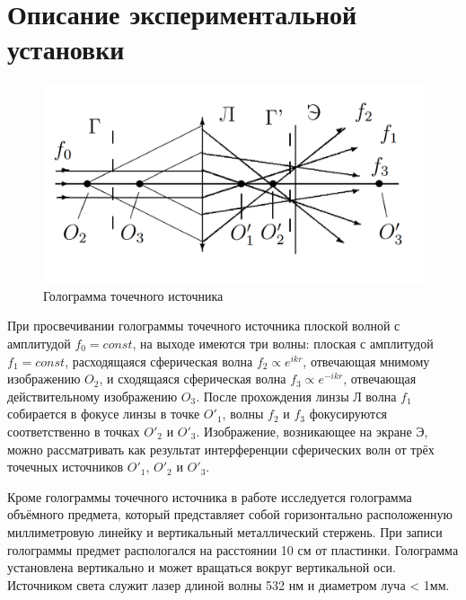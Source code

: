 \section*{Описание экспериментальной установки}
\begin{figure}[H]
	\centering
	\includegraphics[width=1\textwidth]{../Изображения/Схема установки.png}
	\caption{Голограмма точечного источника}
\end{figure}

При просвечивании голограммы точечного источника плоской волной с амплитудой $f_{0} = const$, на выходе имеются три волны: плоская с амплитудой $f_{1} = const$, расходящаяся сферическая волна $f_{2} \propto e^{ikr}$, отвечающая мнимому изображению $O_{2}$, и сходящаяся сферическая волна $f_{3} \propto e^{-ikr}$, отвечающая действительному изображению $O_{3}$. После прохождения линзы Л волна $f_{1}$ собирается в фокусе линзы в точке ${O}'_{1}$, волны $f_{2}$ и $f_{3}$ фокусируются соответственно в точках ${O}'_{2}$ и ${O}'_{3}$. Изображение, возникающее на экране Э, можно рассматривать как результат интерференции сферических волн от трёх точечных источников ${O}'_{1}$, ${O}'_{2}$ и ${O}'_{3}$.

Кроме голограммы точечного источника в работе исследуется голограмма объёмного предмета, который представляет собой горизонтально расположенную миллиметровую линейку и вертикальный металлический стержень. При записи голограммы предмет распологался на расстоянии 10 см от пластинки. Голограмма установлена вертикально и может вращаться вокруг вертикальной оси. Источником света служит лазер длиной волны 532 нм и диаметром луча < 1мм. 